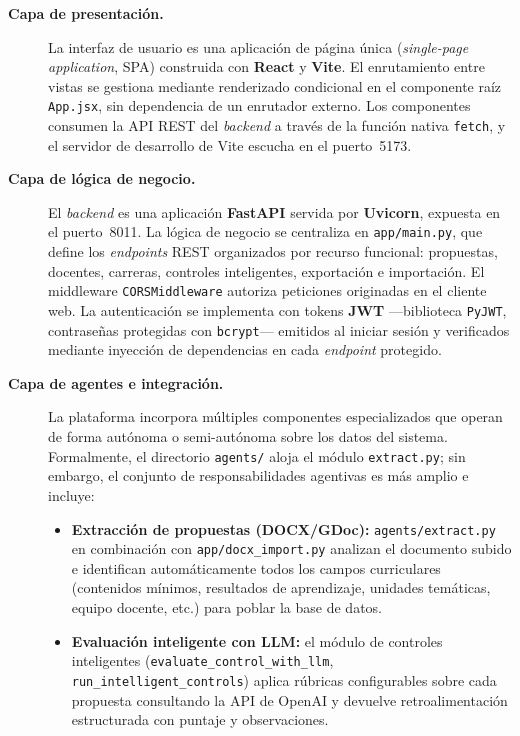 \begin{description}

  \item[\textbf{Capa de presentación.}]
  La interfaz de usuario es una aplicación de página única
  (\textit{single-page application}, SPA) construida con
  \textbf{React} y \textbf{Vite}.
  El enrutamiento entre vistas se gestiona mediante renderizado condicional
  en el componente raíz \texttt{App.jsx}, sin dependencia de un enrutador
  externo.
  Los componentes consumen la API REST del \textit{backend} a través de la
  función nativa \texttt{fetch}, y el servidor de desarrollo de Vite escucha
  en el puerto~5173.

  \item[\textbf{Capa de lógica de negocio.}]
  El \textit{backend} es una aplicación \textbf{FastAPI} servida por
  \textbf{Uvicorn}, expuesta en el puerto~8011.
  La lógica de negocio se centraliza en \texttt{app/main.py}, que define los \textit{endpoints} REST organizados por
  recurso funcional: propuestas, docentes, carreras, controles inteligentes,
  exportación e importación.
  El middleware \texttt{CORSMiddleware} autoriza peticiones originadas en el
  cliente web.
  La autenticación se implementa con tokens \textbf{JWT} —biblioteca
  \texttt{PyJWT}, contraseñas protegidas con \texttt{bcrypt}—
  emitidos al iniciar sesión y verificados mediante inyección de dependencias
  en cada \textit{endpoint} protegido.

  \item[\textbf{Capa de agentes e integración.}]
  La plataforma incorpora múltiples componentes especializados que operan de
  forma autónoma o semi-autónoma sobre los datos del sistema.
  Formalmente, el directorio \texttt{agents/} aloja el módulo
  \texttt{extract.py}; sin embargo, el conjunto de responsabilidades
  agentivas es más amplio e incluye:

  \begin{itemize}[leftmargin=1.5em, itemsep=2pt]
    \item \textbf{Extracción de propuestas (DOCX/GDoc):}
          \texttt{agents/extract.py} en combinación con
          \texttt{app/docx\_import.py} analizan el documento subido e
          identifican automáticamente todos los campos curriculares
          (contenidos mínimos, resultados de aprendizaje, unidades
          temáticas, equipo docente, etc.) para poblar la base de datos.

    \item \textbf{Evaluación inteligente con LLM:}
          el módulo de controles inteligentes (\texttt{evaluate\_control\-\_with\_llm},
          \texttt{run\_intelligent\_controls}) aplica rúbricas configurables
          sobre cada propuesta consultando la API de OpenAI y devuelve
          retroalimentación estructurada con puntaje y observaciones.


\end{itemize}
\end{description}
